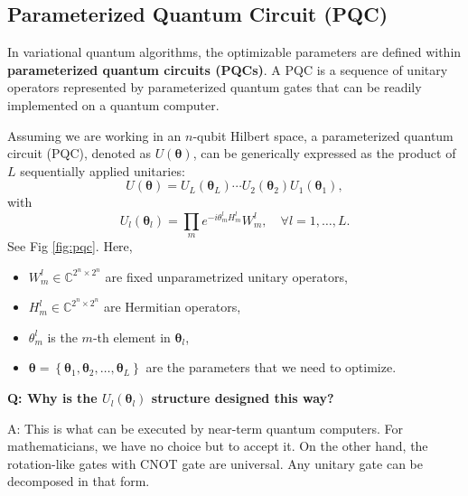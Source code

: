 \documentclass[
        11pt, %
	a4paper, %
]{LegrandOrangeBook}
\begin{document}
\subsection{Parameterized Quantum Circuit (PQC) \cite{cerezo2021variational}}

In variational quantum algorithms, the optimizable parameters are defined within \textbf{parameterized quantum circuits (PQCs)}. A PQC is a sequence of unitary operators represented by parameterized quantum gates that can be readily implemented on a quantum computer.

Assuming we are working in an $n$-qubit Hilbert space, a parameterized quantum circuit (PQC), denoted as $U(\boldsymbol{\theta})$, can be generically expressed as the product of $L$ sequentially applied unitaries:
\begin{equation}
    U(\boldsymbol{\theta})=U_L\left(\boldsymbol{\theta}_L\right) \cdots U_2\left(\boldsymbol{\theta}_2\right) U_1\left(\boldsymbol{\theta}_1\right),
\end{equation}
with
\begin{equation}
    U_l\left(\boldsymbol{\theta}_l\right)=\prod_m e^{-i \theta_m^{l} H_m^{l}} W_m^{l}, \quad \forall l =1, \dots,L.
\end{equation}
See Fig \ref{fig:pqc}. Here, 
\begin{itemize}
    \item $W_m^{l} \in \mathbb{C}^{2^n \times 2^n}$ are fixed unparametrized unitary operators,
    \item $H_m^{l} \in \mathbb{C}^{2^n \times 2^n}$ are Hermitian operators,
    \item $\theta_m^{l}$ is the $m$-th element in $\boldsymbol{\theta}_l$,
    \item $\boldsymbol{\theta}=\left\{\boldsymbol{\theta}_1, \boldsymbol{\theta}_2, \ldots, \boldsymbol{\theta}_L \right\}$ are the parameters that we need to optimize.
\end{itemize}

\textbf{Q: Why is the $U_l\left(\boldsymbol{\theta}_l\right)$ structure designed this way? }

A: This is what can be executed by near-term quantum computers. For mathematicians, we have no choice but to accept it. On the other hand, the rotation-like gates with CNOT gate are universal. Any unitary gate can be decomposed in that form.
\end{document}
